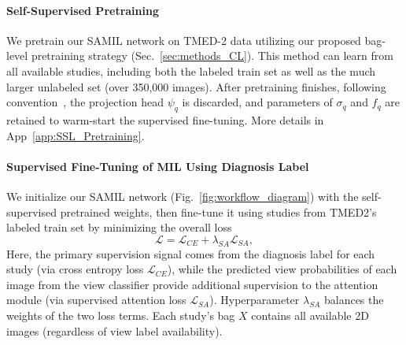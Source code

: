 \paragraph{Self-Supervised Pretraining} 
We pretrain our SAMIL network on TMED-2 data utilizing our proposed bag-level pretraining strategy (Sec.~\ref{sec:methods_CL}).  This method can learn from all available studies, including both the labeled train set as well as the much larger unlabeled set (over 350,000 images).
After pretraining finishes, following convention~\citep{chen2020improved, chen2020simple}, the projection head $\psi_q$ is discarded, and parameters of $\sigma_q$ and $f_q$ are retained to warm-start the supervised fine-tuning. More details in App~\ref{app:SSL_Pretraining}.



\paragraph{Supervised Fine-Tuning of MIL Using Diagnosis Label}
We initialize our SAMIL network (Fig.~\ref{fig:workflow_diagram}) with the self-supervised pretrained weights, then fine-tune it using studies from TMED2's labeled train set by minimizing the overall loss 
\begin{equation}
\label{eq:total_loss}
\mathcal{L} = \mathcal{L}_{CE} + \lambda_{SA} \mathcal{L}_{SA},
\end{equation}
Here, the primary supervision signal comes from the diagnosis label for each study (via cross entropy loss $\mathcal{L}_{CE}$), while the predicted view probabilities of each image from the view classifier provide additional supervision to the attention module (via supervised attention loss $\mathcal{L}_{SA}$). 
Hyperparameter $\lambda_{SA}$ balances the weights of the two loss terms. 
Each study's bag $X$ contains all available 2D images (regardless of view label availability).